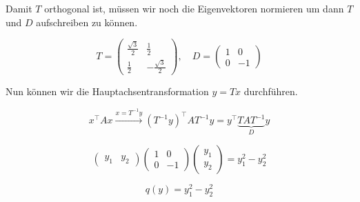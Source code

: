\begin{solution}
    Damit \( T \) orthogonal ist, müssen wir noch die Eigenvektoren normieren um dann \( T \) und \( D \) aufschreiben zu können. 

    \begin{equation*}
        T = \begin{pmatrix}
            \frac{\sqrt{3}}{2} & \frac{1}{2} \\
            \frac{1}{2} & -\frac{\sqrt{3}}{2} 
            \end{pmatrix}, \quad D = \begin{pmatrix}
                1 & 0 \\
                0 & -1
            \end{pmatrix}
    \end{equation*}

    Nun können wir die Hauptachsentransformation \( y = Tx \) durchführen.

    \begin{equation*}
        x^\top Ax \xrightarrow{x=T^{-1}y} (T^{-1}y)^\top A T^{-1}y = y^\top \underbrace{T A T^{-1}}_{D} y
    \end{equation*}

    \begin{equation*}
        \begin{pmatrix}
            y_1 & y_2
        \end{pmatrix} \begin{pmatrix}
            1 & 0 \\
            0 & -1
        \end{pmatrix} \begin{pmatrix}
            y_1 \\ y_2
        \end{pmatrix} = y_1^2 - y_2^2
    \end{equation*}

    \vspace{0.5\baselineskip}

    \begin{equation*}
        q(y) = y_1^2 - y_2^2
    \end{equation*}

\end{solution}